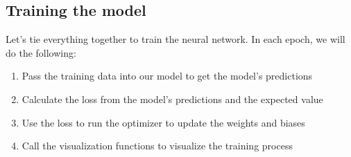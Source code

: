 \documentclass[11pt]{article}
\providecommand{\tightlist}{%
      \setlength{\itemsep}{0pt}\setlength{\parskip}{0pt}}
\begin{document}
    \subsection{Training the model}\label{training-the-model}

Let's tie everything together to train the neural network. In each
epoch, we will do the following:

\begin{enumerate}
\def\labelenumi{\arabic{enumi}.}
\tightlist
\item
  Pass the training data into our model to get the model's predictions
\item
  Calculate the loss from the model's predictions and the expected value
\item
  Use the loss to run the optimizer to update the weights and biases
\item
  Call the visualization functions to visualize the training process
\end{enumerate}
\end{document}
